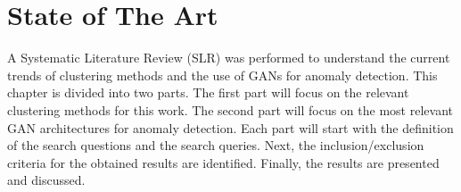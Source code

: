 \chapter{State of The Art} \label{chap:sota}




A Systematic Literature Review (SLR) was performed to understand the current trends of clustering methods and the use of GANs for anomaly detection. This chapter is divided into two parts. The first part will focus on the relevant clustering methods for this work. The second part will focus on the most relevant GAN architectures for anomaly detection. Each part will start with the definition of the search questions and the search queries. Next, the inclusion/exclusion criteria for the obtained results are identified. Finally, the results are presented and discussed.


